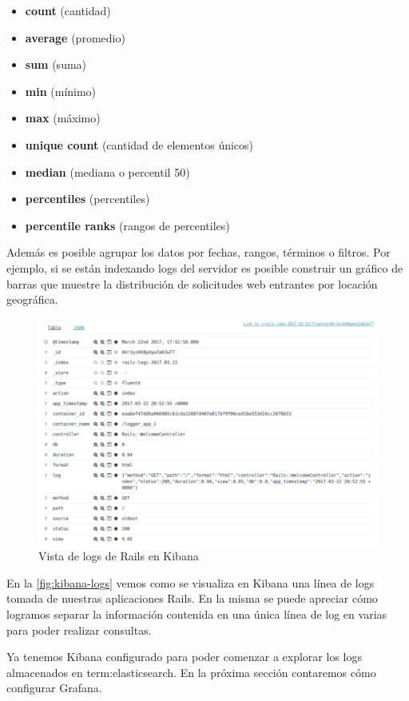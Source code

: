 \begin{itemize}
  \item \textbf{count} (cantidad)
  \item \textbf{average} (promedio)
  \item \textbf{sum} (suma)
  \item \textbf{min} (mínimo)
  \item \textbf{max} (máximo)
  \item \textbf{unique count} (cantidad de elementos únicos)
  \item \textbf{median} (mediana o percentil 50)
  \item \textbf{percentiles} (percentiles)
  \item \textbf{percentile ranks} (rangos de percentiles)
\end{itemize}



Además es posible agrupar los datos por fechas, rangos, términos o filtros. Por ejemplo, si se están indexando logs del servidor es posible construir un gráfico de barras que muestre la distribución de solicitudes web entrantes por locación geográfica.


\begin{figure}
  \includegraphics[width=\linewidth]{src/images/05-capitulo-5/kibana-logs.png}
  \caption{Vista de logs de Rails en Kibana}
  \label{fig:kibana-logs}
\end{figure}

En la \autoref{fig:kibana-logs} vemos como se visualiza en Kibana una línea de logs tomada de nuestras aplicaciones Rails. En la misma se puede apreciar cómo logramos separar la información contenida en una única línea de log en varias para poder realizar consultas.

Ya tenemos Kibana configurado para poder comenzar a explorar los logs almacenados en \gls{term:elasticsearch}. En la próxima sección contaremos cómo configurar Grafana.
